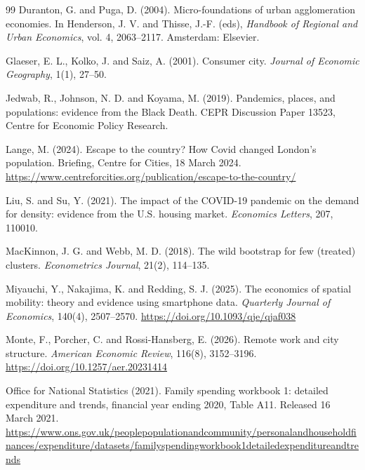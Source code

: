 \documentclass[11pt,a4paper]{article}
\begin{document}
\begin{thebibliography}{99}
Duranton, G. and Puga, D. (2004). Micro-foundations of urban agglomeration economies. In Henderson, J. V. and Thisse, J.-F. (eds), \textit{Handbook of Regional and Urban Economics}, vol. 4, 2063--2117. Amsterdam: Elsevier.

Glaeser, E. L., Kolko, J. and Saiz, A. (2001). Consumer city. \textit{Journal of Economic Geography}, 1(1), 27--50.

Jedwab, R., Johnson, N. D. and Koyama, M. (2019). Pandemics, places, and populations: evidence from the Black Death. CEPR Discussion Paper 13523, Centre for Economic Policy Research.

Lange, M. (2024). Escape to the country? How Covid changed London's population. Briefing, Centre for Cities, 18 March 2024. \url{https://www.centreforcities.org/publication/escape-to-the-country/}

Liu, S. and Su, Y. (2021). The impact of the COVID-19 pandemic on the demand for density: evidence from the U.S. housing market. \textit{Economics Letters}, 207, 110010.

MacKinnon, J. G. and Webb, M. D. (2018). The wild bootstrap for few (treated) clusters. \textit{Econometrics Journal}, 21(2), 114--135.

Miyauchi, Y., Nakajima, K. and Redding, S. J. (2025). The economics of spatial mobility: theory and evidence using smartphone data. \textit{Quarterly Journal of Economics}, 140(4), 2507--2570. \url{https://doi.org/10.1093/qje/qjaf038}

Monte, F., Porcher, C. and Rossi-Hansberg, E. (2026). Remote work and city structure. \textit{American Economic Review}, 116(8), 3152--3196. \url{https://doi.org/10.1257/aer.20231414}

Office for National Statistics (2021). Family spending workbook 1: detailed expenditure and trends, financial year ending 2020, Table A11. Released 16 March 2021. \url{https://www.ons.gov.uk/peoplepopulationandcommunity/personalandhouseholdfinances/expenditure/datasets/familyspendingworkbook1detailedexpenditureandtrends}


\end{thebibliography}
\end{document}
